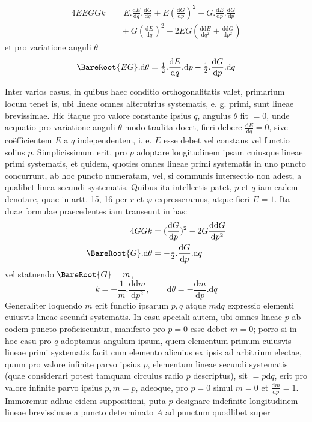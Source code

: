 %
\[
\begin{aligned}
4EEGGk&=E\mathord{.}\frac{\mathrm{d}E}{\mathrm{d}q}\mathord{.}\frac{\mathrm{d}G}{\mathrm{d}q}+E(\frac{\mathrm{d}G}{\mathrm{d}p})^2+G\mathord{.}\frac{\mathrm{d}E}{\mathrm{d}p}\mathord{.}\frac{\mathrm{d}G}{\mathrm{d}p}\\
&\quad+G(\frac{\mathrm{d}E}{\mathrm{d}q})^2-2EG(\frac{\mathrm{d}\mathrm{d}E}{\mathrm{d}q^2}+\frac{\mathrm{d}\mathrm{d}G}{\mathrm{d}p^2})
\end{aligned}
\]
et pro variatione anguli \(\theta\)
\[
\BareRoot{EG}\mathord{.}\mathrm{d}\theta=\tfrac{1}{2}\mathord{.}\frac{\mathrm{d}E}{\mathrm{d}q}\mathord{.}\mathrm{d}p-\tfrac{1}{2}\mathord{.}\frac{\mathrm{d}G}{\mathrm{d}p}\mathord{.}\mathrm{d}q
\]
\par\indent Inter varios casus, in quibus haec conditio orthogonalitatis valet, primarium locum tenet is, ubi lineae omnes alterutrius systematis, e. g. primi, sunt lineae brevissimae. Hic itaque pro valore constante ipsius \(q\), angulus \(\theta\) fit \(=0\), unde aequatio pro variatione anguli \(\theta\) modo tradita docet, fieri debere \(\frac{\mathrm{d}E}{\mathrm{d}q}=0\), sive coëfficientem \(E\) a \(q\) independentem, i. e. \(E\) esse debet vel constans vel functio solius \(p\). Simplicissimum erit, pro \(p\) adoptare longitudinem ipsam cuiusque lineae primi systematis, et quidem, quoties omnes lineae primi systematis in uno puncto concurrunt, ab hoc puncto numeratam, vel, si communis intersectio non adest, a qualibet linea secundi systematis. Quibus ita intellectis patet, \(p\) et \(q\) iam eadem denotare, quae in artt. 15, 16 per \(r\) et \(\varphi\) expresseramus, atque fieri \(E=1\). Ita duae formulae praecedentes iam transeunt in has:
\[
\begin{aligned}
4GGk&=(\frac{\mathrm{d}G}{\mathrm{d}p})^2-2G\frac{\mathrm{d}\mathrm{d}G}{\mathrm{d}p^2}\\
\BareRoot{G}\mathord{.}\mathrm{d}\theta&=-\tfrac{1}{2}\mathord{.}\frac{\mathrm{d}G}{\mathrm{d}p}\mathord{.}\mathrm{d}q
\end{aligned}
\]
vel statuendo \(\BareRoot{G}=m\),
\[
k=-\frac{1}{m}\mathord{.}\frac{\mathrm{d}\mathrm{d}m}{\mathrm{d}p^2},\qquad\mathrm{d}\theta=-\frac{\mathrm{d}m}{\mathrm{d}p}\mathord{.}\mathrm{d}q
\]
Generaliter loquendo \(m\) erit functio ipsarum \(p,q\) atque \(m\mathrm{d}q\) expressio elementi cuiusvis lineae secundi systematis. In casu speciali autem, ubi omnes lineae \(p\) ab eodem puncto proficiscuntur, manifesto pro \(p=0\) esse debet \(m=0\); porro si in hoc casu pro \(q\) adoptamus angulum ipsum, quem elementum primum cuiusvis lineae primi systematis facit cum elemento alicuius ex ipsis ad arbitrium electae, quum pro valore infinite parvo ipsius \(p\), elementum lineae secundi systematis (quae considerari potest tamquam circulus radio \(p\) descriptus), sit \(=p\mathrm{d}q\), erit pro valore infinite parvo ipsius \(p,m=p\), adeoque, pro \(p=0\) simul \(m=0\) et \(\frac{\mathrm{d}m}{\mathrm{d}p}=1\).
Immoremur adhuc eidem suppositioni, puta \(p\) designare indefinite longitudinem lineae brevissimae a puncto determinato \(A\) ad punctum quodlibet super%
